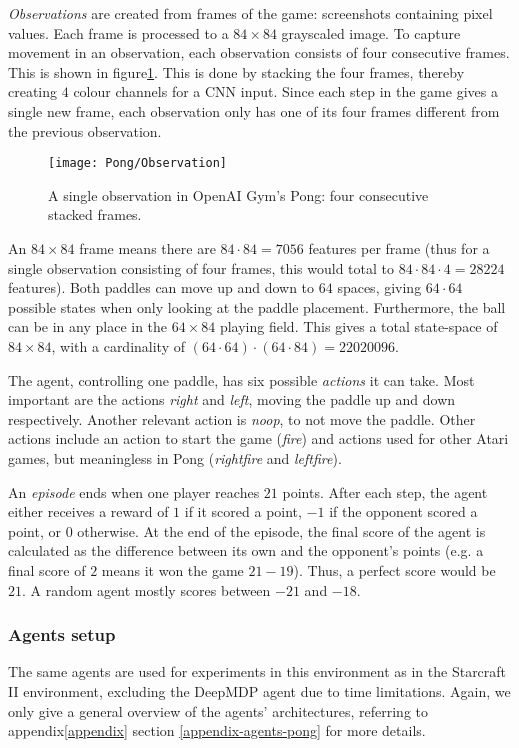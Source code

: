 \emph{Observations} are created from frames of the game: screenshots containing pixel values. Each frame is processed to a $84 \times 84$ grayscaled image. To capture movement in an observation, each observation consists of four consecutive frames. This is shown in figure\ref{fig:pong-obs}. This is done by stacking the four frames, thereby creating $4$ colour channels for a CNN input. Since each step in the game gives a single new frame, each observation only has one of its four frames different from the previous observation.

\begin{figure}[h]
    \centering
    \texttt{[image: Pong/Observation]}
    \caption{A single observation in OpenAI Gym's Pong: four consecutive stacked frames.}
    \label{fig:pong-obs}
\end{figure}

An $84 \times 84$ frame means there are $ 84 \cdot 84 = 7056$ features per frame (thus for a single observation consisting of four frames, this would total to $84 \cdot 84 \cdot 4 = 28224$ features). Both paddles can move up and down to $64$ spaces, giving $64 \cdot 64$ possible states when only looking at the paddle placement. Furthermore, the ball can be in any place in the $64 \times 84$ playing field. This gives a total state-space of $84 \times 84$, with a cardinality of $(64 \cdot 64) \cdot (64 \cdot 84) = 22020096$. 

The agent, controlling one paddle, has six possible \emph{actions} it can take. Most important are the actions \textit{right} and \textit{left}, moving the paddle up and down respectively. Another relevant action is \textit{noop}, to not move the paddle. Other actions include an action to start the game (\textit{fire}) and actions used for other Atari games, but meaningless in Pong (\textit{rightfire} and \textit{leftfire}). 

An \emph{episode} ends when one player reaches $21$ points. After each step, the agent either receives a reward of $1$ if it scored a point, $-1$ if the opponent scored a point, or $0$ otherwise. At the end of the episode, the final score of the agent is calculated as the difference between its own and the opponent's points (e.g. a final score of $2$ means it won the game $21 - 19$). Thus, a perfect score would be $21$. A random agent mostly scores between $-21$ and $-18$.

\subsubsection*{Agents setup}
The same agents are used for experiments in this environment as in the Starcraft II environment, excluding the DeepMDP agent due to time limitations. Again, we only give a general overview of the agents' architectures, referring to appendix\ref{appendix} section \ref{appendix-agents-pong} for more details.

